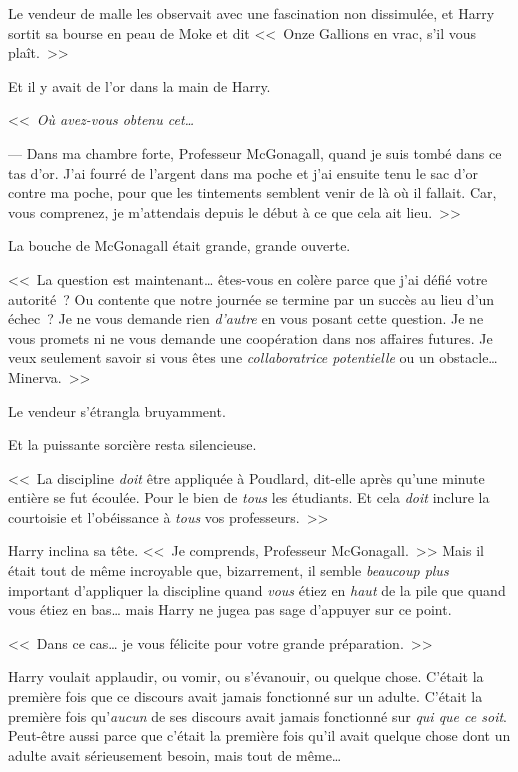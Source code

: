 Le vendeur de malle les observait avec une fascination non dissimulée, et Harry sortit sa bourse en peau de Moke et dit <<~Onze Gallions en vrac, s'il vous plaît.~>>

Et il y avait de l'or dans la main de Harry.

<<~\emph{Où avez-vous obtenu cet…}

--- Dans ma chambre forte, Professeur McGonagall, quand je suis tombé dans ce tas d'or. J'ai fourré de l'argent dans ma poche et j'ai ensuite tenu le sac d'or contre ma poche, pour que les tintements semblent venir de là où il fallait. Car, vous comprenez, je m'attendais depuis le début à ce que cela ait lieu.~>>

La bouche de McGonagall était grande, grande ouverte.

<<~La question est maintenant… êtes-vous en colère parce que j'ai défié votre autorité~? Ou contente que notre journée se termine par un succès au lieu d'un échec~? Je ne vous demande rien \emph{d'autre} en vous posant cette question. Je ne vous promets ni ne vous demande une coopération dans nos affaires futures. Je veux seulement savoir si vous êtes une \emph{collaboratrice potentielle} ou un obstacle… Minerva.~>>

Le vendeur s'étrangla bruyamment.

Et la puissante sorcière resta silencieuse.

<<~La discipline \emph{doit} être appliquée à Poudlard, dit-elle après qu'une minute entière se fut écoulée. Pour le bien de \emph{tous} les étudiants. Et cela \emph{doit} inclure la courtoisie et l'obéissance à \emph{tous} vos professeurs.~>>

Harry inclina sa tête. <<~Je comprends, Professeur McGonagall.~>> Mais il était tout de même incroyable que, bizarrement, il semble \emph{beaucoup plus} important d'appliquer la discipline quand \emph{vous} étiez en \emph{haut} de la pile que quand vous étiez en bas… mais Harry ne jugea pas sage d'appuyer sur ce point.

<<~Dans ce cas… je vous félicite pour votre grande préparation.~>>

Harry voulait applaudir, ou vomir, ou s'évanouir, ou quelque chose. C'était la première fois que ce discours avait jamais fonctionné sur un adulte. C'était la première fois qu'\emph{aucun} de ses discours avait jamais fonctionné sur \emph{qui que ce soit}. Peut-être aussi parce que c'était la première fois qu'il avait quelque chose dont un adulte avait sérieusement besoin, mais tout de même…

